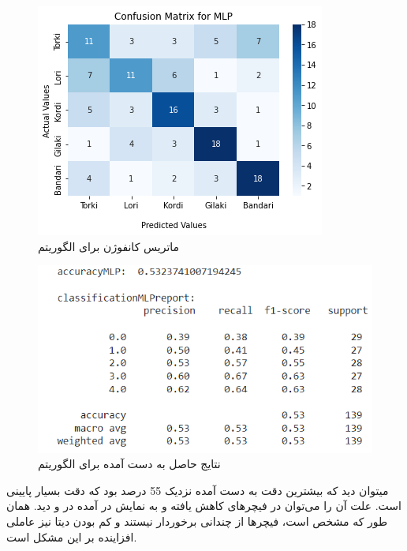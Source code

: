 \begin{figure}[h!]
	\centering
	\includegraphics[width=0.75\linewidth]{images/mlp_confusion_matrix.png}
	\caption{ماتریس کانفوژن برای الگوریتم }
	\label{fig:mlp_confusion_matrix}
\end{figure}
\newpage
\begin{figure}[h!]
	\centering
	\includegraphics[width=0.9\linewidth]{images/mlp_scores.PNG}
	\caption{نتایج حاصل به دست آمده برای الگوریتم }
	\label{fig:mlp_scores}
\end{figure}



میتوان دید که بیشترین دقت به دست آمده نزدیک 55 درصد بود که دقت بسیار پایینی است. علت آن را می‌توان در فیچرهای کاهش یافته و به نمایش در آمده
در  و  دید. همان طور که مشخص است، فیچرها از  چندانی برخوردار نیستند
و کم بودن دیتا نیز عاملی افزاینده بر این مشکل است.

